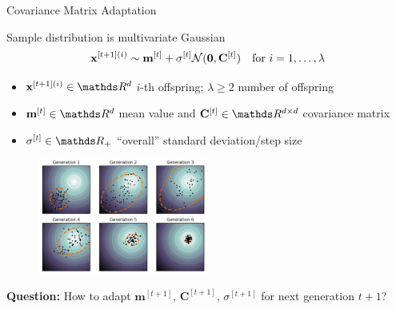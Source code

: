 \documentclass[11pt,compress,t,notes=noshow, xcolor=table]{beamer}
\begin{document}
\begin{vbframe}{Covariance Matrix Adaptation}

Sample distribution is multivariate Gaussian
$$
    \mathbf{x}^{[t+1](i)} \sim \mathbf{m}^{[t]} + \sigma^{[t]} \mathcal{N} (\bm{0}, \mathbf{C}^{[t]}) \quad \text{for } i = 1, \dots, \lambda
$$
\vspace{-20pt}
\begin{itemize}
\item $\xv^{[t+1](i)} \in \R^d$ $i$-th offspring; $\lambda \geq 2$ number of offspring
\item $\mathbf{m}^{[t]} \in \R^d$ mean value and $\mathbf{C}^{[t]} \in \R^{d \times d}$ covariance matrix
\item $\sigma^{[t]} \in \R_{+}$ \enquote{overall} standard deviation/step size
\end{itemize}

\begin{figure}
  \includegraphics[width=0.5\textwidth]{figure_man/cmaes/cmaes_generations.png}
\end{figure}


\textbf{Question:} How to adapt $\mathbf{m}^{[t+1]}$, $\mathbf{C}^{[t+1]}$, $\sigma^{[t+1]}$ for next generation $t+1$?

\end{vbframe}



\end{document}
